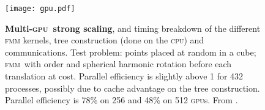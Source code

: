 \documentclass[10pt,twocolumn]{article}
\newcommand{\fmm}{\textsc{fmm}\xspace}
\newcommand{\cpu}{\textsc{cpu}}
\newcommand{\gpu}{\textsc{gpu}}
\begin{document}
\begin{figure}\begin{center}
\texttt{[image: gpu.pdf]}
\end{center}
\vspace{-0.5em}\caption{\textbf{Multi-\gpu\ strong scaling}, and timing breakdown of the different \fmm kernels, tree construction (done on the \cpu) and communications. Test problem:  points placed at random in a cube; \fmm\ with  order  and spherical harmonic rotation before each translation at  cost. Parallel efficiency is slightly above 1 for 432 processes, possibly due to cache advantage on the tree construction.  Parallel efficiency is 78\% on 256  and 48\% on 512 \gpu s. From \cite{YokotaETal2011b}.}
\label{fig:gpu}
\end{figure}
\end{document}
